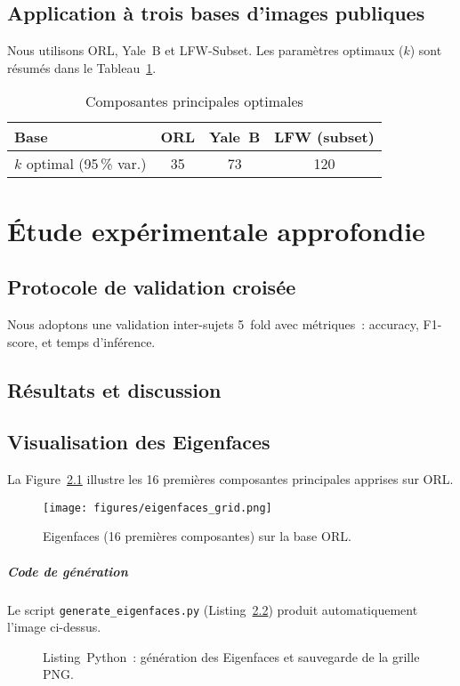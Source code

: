 \documentclass[12pt,a4paper]{report}
\begin{document}
\section{Application à trois bases d'images publiques}
Nous utilisons ORL, Yale B et LFW-Subset. Les paramètres optimaux ($k$) sont résumés dans le Tableau~\ref{tab:kopt}.
\begin{table}[H]\centering
 \caption{Composantes principales optimales}
 \label{tab:kopt}
 \begin{tabular}{lccc}
  \toprule
  Base & ORL & Yale~B & LFW (subset)\\
  \midrule
  $k$ optimal (95\,\% var.) & 35 & 73 & 120\\
  \bottomrule
 \end{tabular}
\end{table}

\chapter{Étude expérimentale approfondie}
\section{Protocole de validation croisée}
Nous adoptons une validation inter-sujets 5~fold avec métriques : accuracy, F1-score, et temps d'inférence.

\section{Résultats et discussion}

\section{Visualisation des Eigenfaces}
La Figure~\ref{fig:eigenfaces} illustre les 16 premières composantes principales apprises sur ORL.
\begin{figure}[H]
 \centering
 \texttt{[image: figures/eigenfaces\_grid.png]}
 \caption{Eigenfaces (16 premières composantes) sur la base ORL.}
 \label{fig:eigenfaces}
\end{figure}

\paragraph{Code de génération}
Le script \texttt{generate\_eigenfaces.py} (Listing~\ref{lst:python}) produit automatiquement l'image ci-dessus.
\begin{figure}[H]
 
 \caption{Listing Python : génération des Eigenfaces et sauvegarde de la grille PNG.}
 \label{lst:python}
\end{figure}
\end{document}
